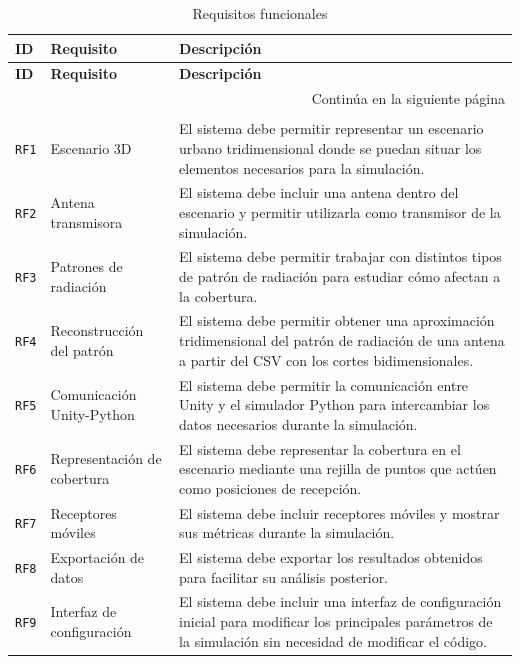 \begin{longtable}{@{}p{}p{}p{}@{}}
    \toprule
    \textbf{ID} & \textbf{Requisito} & \textbf{Descripción}\\
    \midrule
    \endfirsthead

    \toprule
    \textbf{ID} & \textbf{Requisito} & \textbf{Descripción}\\
    \midrule
    \endhead

    \midrule
    \multicolumn{3}{r}{Continúa en la siguiente página}\\
    \endfoot

    \bottomrule
    \addlinespace[0.4em]
    \caption{Requisitos funcionales}
    \label{tab:requisitos_funcionales}\\
    \endlastfoot

    \texttt{RF1} & Escenario 3D & El sistema debe permitir representar un escenario urbano tridimensional donde se puedan situar los elementos necesarios para la simulación.\\
    \texttt{RF2} & Antena transmisora & El sistema debe incluir una antena dentro del escenario y permitir utilizarla como transmisor de la simulación.\\
    \texttt{RF3} & Patrones de radiación & El sistema debe permitir trabajar con distintos tipos de patrón de radiación para estudiar cómo afectan a la cobertura.\\
    \texttt{RF4} & Reconstrucción del patrón & El sistema debe permitir obtener una aproximación tridimensional del patrón de radiación de una antena a partir del CSV con los cortes bidimensionales.\\
    \texttt{RF5} & Comunicación Unity-Python & El sistema debe permitir la comunicación entre Unity y el simulador Python para intercambiar los datos necesarios durante la simulación.\\
    \texttt{RF6} & Representación de cobertura & El sistema debe representar la cobertura en el escenario mediante una rejilla de puntos que actúen como posiciones de recepción.\\
    \texttt{RF7} & Receptores móviles & El sistema debe incluir receptores móviles y mostrar sus métricas durante la simulación.\\
    \texttt{RF8} & Exportación de datos & El sistema debe exportar los resultados obtenidos para facilitar su análisis posterior.\\
    \texttt{RF9} & Interfaz de configuración & El sistema debe incluir una interfaz de configuración inicial para modificar los principales parámetros de la simulación sin necesidad de modificar el código.\\
\end{longtable}

